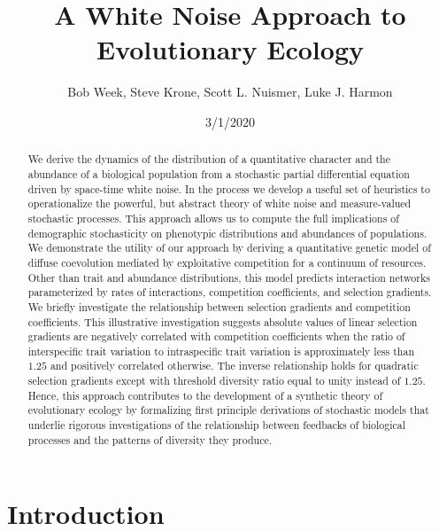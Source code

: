 \documentclass[]{article}
\title{A White Noise Approach to Evolutionary Ecology}
\author{Bob Week, Steve Krone, Scott L. Nuismer, Luke J. Harmon}
\date{3/1/2020}
\begin{document}
\maketitle
\begin{abstract}
We derive the dynamics of the distribution of a quantitative character
and the abundance of a biological population from a stochastic partial
differential equation driven by space-time white noise. In the process
we develop a useful set of heuristics to operationalize the powerful,
but abstract theory of white noise and measure-valued stochastic
processes. This approach allows us to compute the full implications of
demographic stochasticity on phenotypic distributions and abundances of
populations. We demonstrate the utility of our approach by deriving a
quantitative genetic model of diffuse coevolution mediated by
exploitative competition for a continuum of resources. Other than trait
and abundance distributions, this model predicts interaction networks
parameterized by rates of interactions, competition coefficients, and
selection gradients. We briefly investigate the relationship between
selection gradients and competition coefficients. This illustrative
investigation suggests absolute values of linear selection gradients are
negatively correlated with competition coefficients when the ratio of
interspecific trait variation to intraspecific trait variation is
approximately less than \(1.25\) and positively correlated otherwise.
The inverse relationship holds for quadratic selection gradients except
with threshold diversity ratio equal to unity instead of \(1.25\).
Hence, this approach contributes to the development of a synthetic
theory of evolutionary ecology by formalizing first principle
derivations of stochastic models that underlie rigorous investigations
of the relationship between feedbacks of biological processes and the
patterns of diversity they produce.
\end{abstract}

\hypertarget{introduction}{%
\section{Introduction}\label{introduction}}
\end{document}
